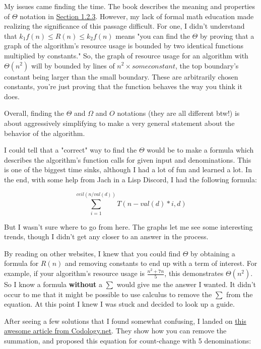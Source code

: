 \documentclass[
]{article}
\begin{document}
My issues came finding the time. The book describes the meaning and
properties of \(\Theta\) notation in
\href{http://sarabander.github.io/sicp/html/1_002e2.xhtml\#g_t1_002e2_002e3}{Section
1.2.3}. However, my lack of formal math education made realizing the
significance of this passage difficult. For one, I didn't understand
that \(k_{1}f(n) \leq R(n) \leq k_{2}f(n)\) means "you can find the
\(\Theta\) by proving that a graph of the algorithm's resource usage is
bounded by two identical functions multiplied by constants." So, the
graph of resource usage for an algorithm with \(\Theta(n^{2})\) will by
bounded by lines of \(n^{2} \times some constant\), the top boundary's
constant being larger than the small boundary. These are arbitrarily
chosen constants, you're just proving that the function behaves the way
you think it does.

Overall, finding the \(\Theta\) and \(\Omega\) and \(O\) notations (they
are all different btw!) is about aggressively simplifying to make a very
general statement about the behavior of the algorithm.

I could tell that a "correct" way to find the \(\Theta\) would be to
make a formula which describes the algorithm's function calls for given
input and denominations. This is one of the biggest time sinks, although
I had a lot of fun and learned a lot. In the end, with some help from
Jach in a Lisp Discord, I had the following formula:

\[
\sum_{i=1}^{ceil(n / val(d))} T(n - val(d)*i, d)
\]

But I wasn't sure where to go from here. The graphs let me see some
interesting trends, though I didn't get any closer to an answer in the
process.

By reading on other websites, I knew that you could find \(\Theta\) by
obtaining a formula for \(R(n)\) and removing constants to end up with a
term of interest. For example, if your algorithm's resource usage is
\(\frac{n^{2} + 7n}{5}\), this demonstrates \(\Theta(n^{2})\). So I know
a formula \textbf{without} a \(\sum\) would give me the answer I wanted.
It didn't occur to me that it might be possible to use calculus to
remove the \(\sum\) from the equation. At this point I knew I was stuck
and decided to look up a guide.

After seeing a few solutions that I found somewhat confusing, I landed
on \href{https://codology.net/post/sicp-solution-exercise-1-14/}{this
awesome article from Codology.net}. They show how you can remove the
summation, and proposed this equation for count-change with 5
denominations:
\end{document}
